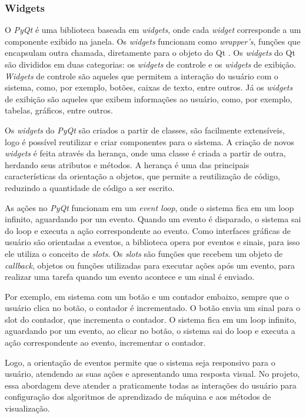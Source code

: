     \subsubsection{Widgets}

	O \textit{PyQt} é uma biblioteca baseada em \textit{widgets}, onde cada \textit{widget} corresponde a um componente exibido na janela. Os \textit{widgets} funcionam como \textit{wrapper's}, funções que encapsulam outra chamada, diretamente para o objeto do Qt \cite{pyqt}. Os \textit{widgets} do Qt são divididos em duas categorias: os \textit{widgets} de controle e os \textit{widgets} de exibição. \textit{Widgets} de controle são aqueles que permitem a interação do usuário com o sistema, com\textit{}o, por exemplo, botões, caixas de texto, entre outros. Já os \textit{widgets} de exibição são aqueles que exibem informações ao usuário, com\textit{}o, por exemplo, tabelas, gráficos, entre outros.

    Os \textit{widgets} do \textit{PyQt} são criados a partir de classes, são facilmente extensíveis, logo é possível reutilizar e criar componentes para o sistema. A criação de novos \textit{widgets} é feita através da herança, onde uma classe é criada a partir de outra, herdando seus atributos e métodos. A herança é uma das principais características da orientação a objetos, que permite a reutilização de código, reduzindo a quantidade de código a ser escrito.

    As ações no \textit{PyQt} funcionam em um \textit{event loop}, onde o sistema fica em um loop infinito, aguardando por um evento. Quando um evento é disparado, o sistema sai do loop e executa a ação correspondente ao evento. Como interfaces gráficas de usuário são orientadas a eventos, a biblioteca opera por eventos e sinais, para isso ele utiliza o conceito de \textit{slots}. Os \textit{slots} são funções que recebem um objeto de \textit{callback}, objetos ou funções utilizadas para executar ações após um evento, para realizar uma tarefa quando um evento acontece e um sinal é enviado.

    Por exemplo, em sistema com um botão e um contador embaixo, sempre que o usuário clica no botão, o contador é incrementado. O botão envia um sinal para o slot do contador, que incrementa o contador. O sistema fica em um loop infinito, aguardando por um evento, ao clicar no botão, o sistema sai do loop e executa a ação correspondente ao evento, incrementar o contador.

    Logo, a orientação de eventos permite que o sistema seja responsivo para o usuário, atendendo as suas ações e apresentando uma resposta visual. No projeto, essa abordagem deve atender a praticamente todas as interações do usuário para configuração dos algoritmos de aprendizado de máquina e aos métodos de visualização.


